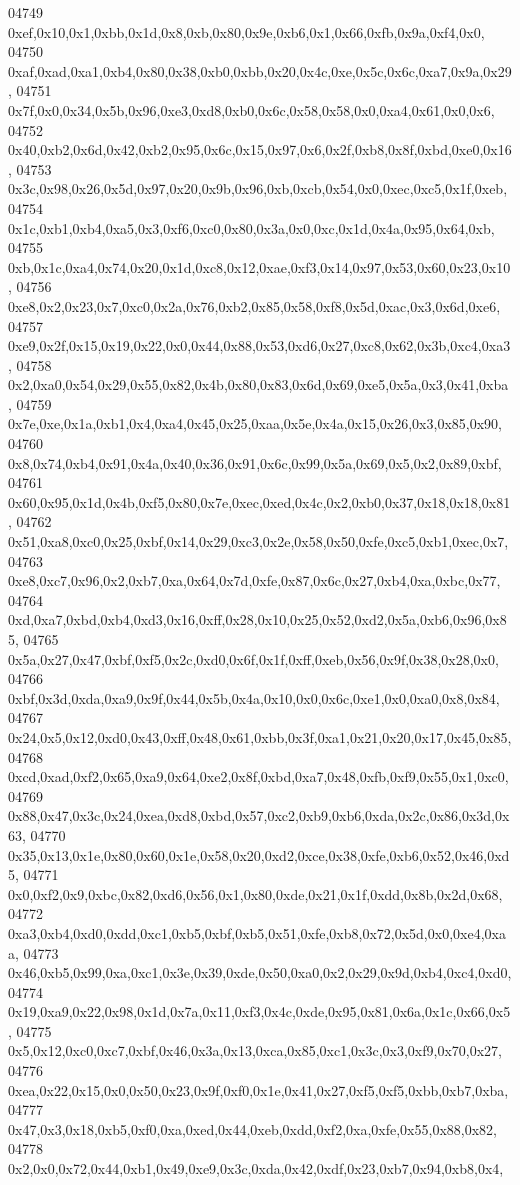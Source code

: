 \begin{DoxyCode}
04749   0xef,0x10,0x1,0xbb,0x1d,0x8,0xb,0x80,0x9e,0xb6,0x1,0x66,0xfb,0x9a,0xf4,0x0,
04750   0xaf,0xad,0xa1,0xb4,0x80,0x38,0xb0,0xbb,0x20,0x4c,0xe,0x5c,0x6c,0xa7,0x9a,0x29,
04751   0x7f,0x0,0x34,0x5b,0x96,0xe3,0xd8,0xb0,0x6c,0x58,0x58,0x0,0xa4,0x61,0x0,0x6,
04752   0x40,0xb2,0x6d,0x42,0xb2,0x95,0x6c,0x15,0x97,0x6,0x2f,0xb8,0x8f,0xbd,0xe0,0x16,
04753   0x3c,0x98,0x26,0x5d,0x97,0x20,0x9b,0x96,0xb,0xcb,0x54,0x0,0xec,0xc5,0x1f,0xeb,
04754   0x1c,0xb1,0xb4,0xa5,0x3,0xf6,0xc0,0x80,0x3a,0x0,0xc,0x1d,0x4a,0x95,0x64,0xb,
04755   0xb,0x1c,0xa4,0x74,0x20,0x1d,0xc8,0x12,0xae,0xf3,0x14,0x97,0x53,0x60,0x23,0x10,
04756   0xe8,0x2,0x23,0x7,0xc0,0x2a,0x76,0xb2,0x85,0x58,0xf8,0x5d,0xac,0x3,0x6d,0xe6,
04757   0xe9,0x2f,0x15,0x19,0x22,0x0,0x44,0x88,0x53,0xd6,0x27,0xc8,0x62,0x3b,0xc4,0xa3,
04758   0x2,0xa0,0x54,0x29,0x55,0x82,0x4b,0x80,0x83,0x6d,0x69,0xe5,0x5a,0x3,0x41,0xba,
04759   0x7e,0xe,0x1a,0xb1,0x4,0xa4,0x45,0x25,0xaa,0x5e,0x4a,0x15,0x26,0x3,0x85,0x90,
04760   0x8,0x74,0xb4,0x91,0x4a,0x40,0x36,0x91,0x6c,0x99,0x5a,0x69,0x5,0x2,0x89,0xbf,
04761   0x60,0x95,0x1d,0x4b,0xf5,0x80,0x7e,0xec,0xed,0x4c,0x2,0xb0,0x37,0x18,0x18,0x81,
04762   0x51,0xa8,0xc0,0x25,0xbf,0x14,0x29,0xc3,0x2e,0x58,0x50,0xfe,0xc5,0xb1,0xec,0x7,
04763   0xe8,0xc7,0x96,0x2,0xb7,0xa,0x64,0x7d,0xfe,0x87,0x6c,0x27,0xb4,0xa,0xbc,0x77,
04764   0xd,0xa7,0xbd,0xb4,0xd3,0x16,0xff,0x28,0x10,0x25,0x52,0xd2,0x5a,0xb6,0x96,0x85,
04765   0x5a,0x27,0x47,0xbf,0xf5,0x2c,0xd0,0x6f,0x1f,0xff,0xeb,0x56,0x9f,0x38,0x28,0x0,
04766   0xbf,0x3d,0xda,0xa9,0x9f,0x44,0x5b,0x4a,0x10,0x0,0x6c,0xe1,0x0,0xa0,0x8,0x84,
04767   0x24,0x5,0x12,0xd0,0x43,0xff,0x48,0x61,0xbb,0x3f,0xa1,0x21,0x20,0x17,0x45,0x85,
04768   0xcd,0xad,0xf2,0x65,0xa9,0x64,0xe2,0x8f,0xbd,0xa7,0x48,0xfb,0xf9,0x55,0x1,0xc0,
04769   0x88,0x47,0x3c,0x24,0xea,0xd8,0xbd,0x57,0xc2,0xb9,0xb6,0xda,0x2c,0x86,0x3d,0x63,
04770   0x35,0x13,0x1e,0x80,0x60,0x1e,0x58,0x20,0xd2,0xce,0x38,0xfe,0xb6,0x52,0x46,0xd5,
04771   0x0,0xf2,0x9,0xbc,0x82,0xd6,0x56,0x1,0x80,0xde,0x21,0x1f,0xdd,0x8b,0x2d,0x68,
04772   0xa3,0xb4,0xd0,0xdd,0xc1,0xb5,0xbf,0xb5,0x51,0xfe,0xb8,0x72,0x5d,0x0,0xe4,0xaa,
04773   0x46,0xb5,0x99,0xa,0xc1,0x3e,0x39,0xde,0x50,0xa0,0x2,0x29,0x9d,0xb4,0xc4,0xd0,
04774   0x19,0xa9,0x22,0x98,0x1d,0x7a,0x11,0xf3,0x4c,0xde,0x95,0x81,0x6a,0x1c,0x66,0x5,
04775   0x5,0x12,0xc0,0xc7,0xbf,0x46,0x3a,0x13,0xca,0x85,0xc1,0x3c,0x3,0xf9,0x70,0x27,
04776   0xea,0x22,0x15,0x0,0x50,0x23,0x9f,0xf0,0x1e,0x41,0x27,0xf5,0xf5,0xbb,0xb7,0xba,
04777   0x47,0x3,0x18,0xb5,0xf0,0xa,0xed,0x44,0xeb,0xdd,0xf2,0xa,0xfe,0x55,0x88,0x82,
04778   0x2,0x0,0x72,0x44,0xb1,0x49,0xe9,0x3c,0xda,0x42,0xdf,0x23,0xb7,0x94,0xb8,0x4,

\end{DoxyCode}
